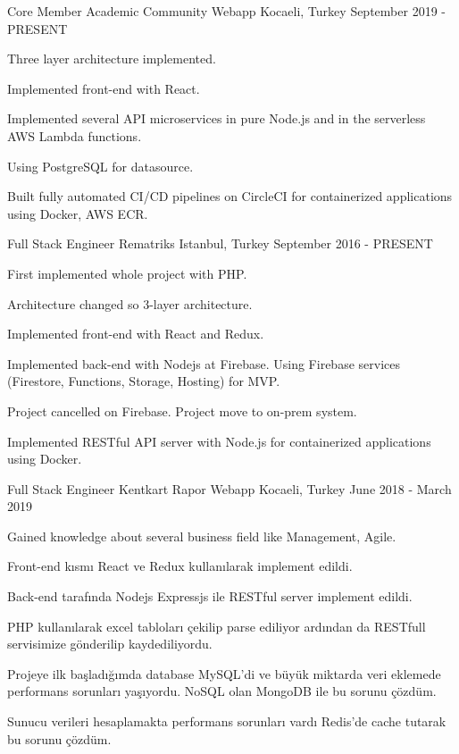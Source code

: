 \begin{cventries}

  \cventry
    {Core Member}
    {Academic Community Webapp}
    {Kocaeli, Turkey}
    {September 2019 - PRESENT}
    {
      \begin{cvitems}
        \item {Three layer architecture implemented.}
        \item {Implemented front-end with React.}
        \item {Implemented several API microservices in pure Node.js and in the serverless AWS Lambda functions.}
        \item {Using PostgreSQL for datasource.}
        \item {Built fully automated CI/CD pipelines on CircleCI for containerized applications using Docker, AWS ECR.}
      \end{cvitems}
    }
    
  \cventry
    {Full Stack Engineer}
    {Rematriks}
    {Istanbul, Turkey}
    {September 2016 - PRESENT}
    {
      \begin{cvitems}
        \item {First implemented whole project with PHP.}
        \item {Architecture changed so 3-layer architecture.}
        \item {Implemented front-end with React and Redux.}
        \item {Implemented back-end with Nodejs at Firebase. Using Firebase services (Firestore, Functions, Storage, Hosting) for MVP.}
        \item {Project cancelled on Firebase. Project move to on-prem system.}
        \item {Implemented RESTful API server  with Node.js for containerized applications using Docker.}
      \end{cvitems}
    }
    
  \cventry
    {Full Stack Engineer}
    {Kentkart Rapor Webapp}
    {Kocaeli, Turkey}
    {June 2018 - March 2019}
    {
      \begin{cvitems}
        \item {Gained knowledge about several business field like Management, Agile.}
        \item {Front-end kısmı React ve Redux kullanılarak implement edildi.}
        \item {Back-end tarafında Nodejs Expressjs ile RESTful server implement edildi.}
        \item {PHP kullanılarak excel tabloları çekilip parse ediliyor ardından da RESTfull servisimize gönderilip kaydediliyordu.}
        \item {Projeye ilk başladığımda database MySQL'di ve büyük miktarda veri eklemede performans sorunları yaşıyordu. NoSQL olan MongoDB ile bu sorunu çözdüm.}
        \item {Sunucu verileri hesaplamakta performans sorunları vardı Redis'de cache tutarak bu sorunu çözdüm.}
      \end{cvitems}
    }
    

\end{cventries}
